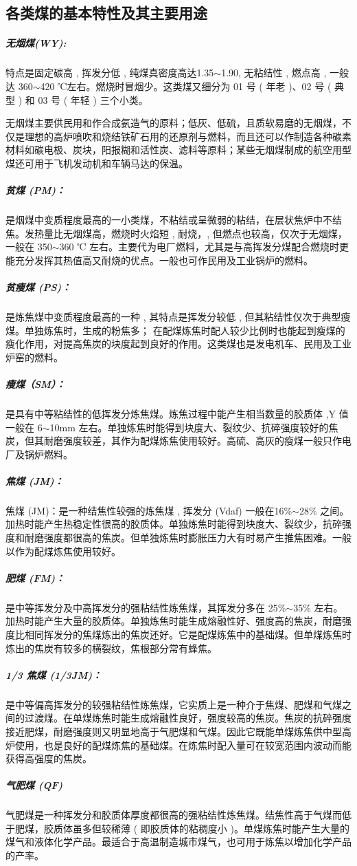 \documentclass[10pt,openany]{ctexbook}
\begin{document}
\subsection{各类煤的基本特性及其主要用途}
\subparagraph{无烟煤(WY):}特点是固定碳高 , 挥发分低 , 纯煤真密度高达1.35$\sim$1.90, 无粘结性 , 燃点高 , 一般达 360$\sim$420 ℃左右。燃烧时冒烟少。这类煤又细分为 01 号 ( 年老 )、02 号 ( 典型 ) 和 03 号 ( 年轻 ) 三个小类。\par
无烟煤主要供民用和作合成氨造气的原料；低灰、低硫，且质软易磨的无烟煤，不仅是理想的高炉喷吹和烧结铁矿石用的还原剂与燃料，而且还可以作制造各种碳素材料如碳电极、炭块，阳报糊和活性炭、滤料等原料；某些无烟煤制成的航空用型煤还可用于飞机发动机和车辆马达的保温。
\subparagraph{贫煤 (PM)：}是烟煤中变质程度最高的一小类煤，不粘结或呈微弱的粘结，在层状焦炉中不结焦。发热量比无烟煤高，燃烧时火焰短 , 耐烧，, 但燃点也较高，仅次于无烟煤，一般在 350$\sim$360 ℃ 左右。主要代为电厂燃料，尤其是与高挥发分煤配合燃烧时更能充分发挥其热值高又耐烧的优点。一般也可作民用及工业锅炉的燃料。
\subparagraph{贫瘦煤 (PS)：} 是炼焦煤中变质程度最高的一种 , 其特点是挥发分较低 , 但其粘结性仅次于典型瘦煤。单独炼焦时，生成的粉焦多； 在配煤炼焦时配人较少比例时也能起到瘦煤的瘦化作用，对提高焦炭的块度起到良好的作用。这类煤也是发电机车、民用及工业炉窑的燃料。
\subparagraph{瘦煤（SM）：} 是具有中等粘结性的低挥发分炼焦煤。炼焦过程中能产生相当数量的胶质体 ,Y 值一般在 6$\sim$10mm 左右。单独炼焦时能得到块度大、裂纹少、抗碎强度较好的焦炭，但其耐磨强度较差，其作为配煤炼焦使用较好。高硫、高灰的瘦煤一般只作电厂及锅炉燃料。
\subparagraph{焦煤 (JM)：}焦煤 (JM)：是一种结焦性较强的炼焦煤 , 挥发分 (Vdaf) 一般在16\%$\sim$28\% 之间。加热时能产生热稳定性很高的胶质体。单独炼焦时能得到块度大、裂纹少，抗碎强度和耐磨强度都很高的焦炭。但单独炼焦时膨胀压力大有时易产生推焦困难。一般以作为配煤炼焦使用较好。
\subparagraph{肥煤 (FM)：}是中等挥发分及中高挥发分的强粘结性炼焦煤，其挥发分多在 25\%$\sim$35\% 左右。加热时能产生大量的胶质体。单独炼焦时能生成熔融性好、强度高的焦炭，耐磨强度比相同挥发分的焦煤炼出的焦炭还好。它是配煤炼焦中的基础煤。但单煤炼焦时炼出的焦炭有较多的横裂纹，焦根部分常有蜂焦。
\subparagraph{1/3 焦煤 (1/3JM)：} 是中等偏高挥发分的较强粘结性炼焦煤，它实质上是一种介于焦煤、肥煤和气煤之间的过渡煤。在单煤炼焦时能生成熔融性良好，强度较高的焦炭。焦炭的抗碎强度接近肥煤，耐磨强度则又明显地高于气肥煤和气煤。因此它既能单煤炼焦供中型高炉使用，也是良好的配煤炼焦的基础煤。在炼焦时配入量可在较宽范围内波动而能获得高强度的焦炭。
\subparagraph{气肥煤 (QF) } 气肥煤是一种挥发分和胶质体厚度都很高的强粘结性炼焦煤。结焦性高于气煤而低于肥煤，胶质体虽多但较稀薄 ( 即胶质体的粘稠度小 )。单煤炼焦时能产生大量的煤气和液体化学产品。最适合于高温制造城市煤气，也可用于炼焦以增加化学产品的产率。
\end{document}
